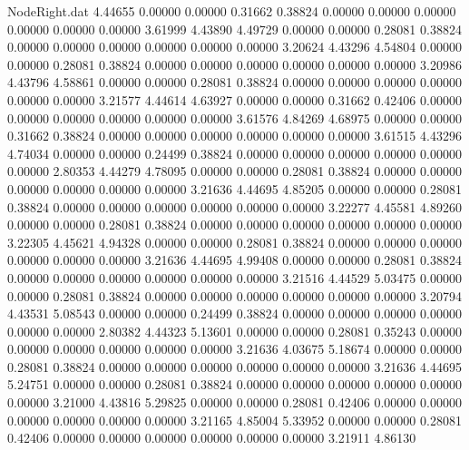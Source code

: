 \begin{filecontents}{NodeRight.dat}
   4.44655    0.00000    0.00000     0.31662    0.38824    0.00000    0.00000    0.00000    0.00000    0.00000    0.00000    3.61999    4.43890
   4.49729    0.00000    0.00000     0.28081    0.38824    0.00000    0.00000    0.00000    0.00000    0.00000    0.00000    3.20624    4.43296
   4.54804    0.00000    0.00000     0.28081    0.38824    0.00000    0.00000    0.00000    0.00000    0.00000    0.00000    3.20986    4.43796
   4.58861    0.00000    0.00000     0.28081    0.38824    0.00000    0.00000    0.00000    0.00000    0.00000    0.00000    3.21577    4.44614
   4.63927    0.00000    0.00000     0.31662    0.42406    0.00000    0.00000    0.00000    0.00000    0.00000    0.00000    3.61576    4.84269
   4.68975    0.00000    0.00000     0.31662    0.38824    0.00000    0.00000    0.00000    0.00000    0.00000    0.00000    3.61515    4.43296
   4.74034    0.00000    0.00000     0.24499    0.38824    0.00000    0.00000    0.00000    0.00000    0.00000    0.00000    2.80353    4.44279
   4.78095    0.00000    0.00000     0.28081    0.38824    0.00000    0.00000    0.00000    0.00000    0.00000    0.00000    3.21636    4.44695
   4.85205    0.00000    0.00000     0.28081    0.38824    0.00000    0.00000    0.00000    0.00000    0.00000    0.00000    3.22277    4.45581
   4.89260    0.00000    0.00000     0.28081    0.38824    0.00000    0.00000    0.00000    0.00000    0.00000    0.00000    3.22305    4.45621
   4.94328    0.00000    0.00000     0.28081    0.38824    0.00000    0.00000    0.00000    0.00000    0.00000    0.00000    3.21636    4.44695
   4.99408    0.00000    0.00000     0.28081    0.38824    0.00000    0.00000    0.00000    0.00000    0.00000    0.00000    3.21516    4.44529
   5.03475    0.00000    0.00000     0.28081    0.38824    0.00000    0.00000    0.00000    0.00000    0.00000    0.00000    3.20794    4.43531
   5.08543    0.00000    0.00000     0.24499    0.38824    0.00000    0.00000    0.00000    0.00000    0.00000    0.00000    2.80382    4.44323
   5.13601    0.00000    0.00000     0.28081    0.35243    0.00000    0.00000    0.00000    0.00000    0.00000    0.00000    3.21636    4.03675
   5.18674    0.00000    0.00000     0.28081    0.38824    0.00000    0.00000    0.00000    0.00000    0.00000    0.00000    3.21636    4.44695
   5.24751    0.00000    0.00000     0.28081    0.38824    0.00000    0.00000    0.00000    0.00000    0.00000    0.00000    3.21000    4.43816
   5.29825    0.00000    0.00000     0.28081    0.42406    0.00000    0.00000    0.00000    0.00000    0.00000    0.00000    3.21165    4.85004
   5.33952    0.00000    0.00000     0.28081    0.42406    0.00000    0.00000    0.00000    0.00000    0.00000    0.00000    3.21911    4.86130

\end{filecontents}
